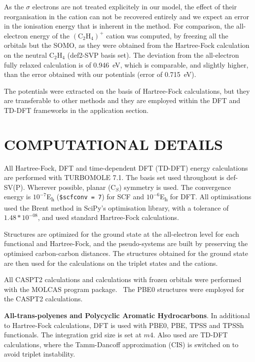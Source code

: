 \documentclass[12pt]{article}
\begin{document}
As the $\sigma$ electrons are not treated explicitely in our model,
the effect of their reorganisation in the cation can not
be recovered entirely and we expect an error in the ionisation energy that is inherent
in the method. For comparison, the all-electron energy of the $(\text{C}_2\text{H}_4)^+$ cation
was computed, by freezing all the orbitals but the SOMO, as they were obtained from
the Hartree-Fock calculation on the neutral $\text{C}_2\text{H}_4$ (def2-SVP basis set).
The deviation from the all-electron fully relaxed calculation is of 0.946~eV, which
is comparable, and slightly higher, than the error obtained with
our potentials (error of 0.715~eV).

The potentials were extracted on the basis of Hartree-Fock calculations, but they are transferable
to other methods and they are employed within the DFT and TD-DFT frameworks in the application section.

\section*{\sffamily \large COMPUTATIONAL DETAILS}

All Hartree-Fock, DFT and time-dependent DFT (TD-DFT) energy calculations are performed with TURBOMOLE 7.1.\cite{TURBOMOLE} The basis set used throughout is def-SV(P).\cite{defsvp} Wherever possible, planar (C\(_{S}\)) symmetry is used. The convergence energy is \(10^{-7}\)E\textsubscript{h} (\texttt{\$scfconv = 7}) for SCF and \(10^{-6}\)E\textsubscript{h} for DFT. All optimisations used the Brent method in SciPy's optimisation library, with a tolerance of \(1.48*10^{-08}\), and used standard Hartree-Fock calculations.\cite{scipy}

Structures are optimized for the ground state at the all-electron level for each functional and Hartree-Fock,
and the pseudo-systems are built by preserving the optimised carbon-carbon distances.
The structures obtained for the ground state are then used for the calculations on the triplet states and
the cations.

All CASPT2 calculations and calculations with frozen orbitals were performed with the 
MOLCAS program package.~\cite{MOLCAS} The PBE0 structures were employed for the
CASPT2 calculations.


\textbf{All-trans-polyenes and Polycyclic Aromatic Hydrocarbons}. In additional to Hartree-Fock calculations, DFT is used with PBE0, PBE, TPSS and TPSSh functionals.\cite{pbe0,pbe,tpss,tpssh} The integration grid size is set at \(m4\). Also used are TD-DFT calculations, where the Tamm-Dancoff approximation (CIS) is switched on to avoid triplet instability.\cite{tammdancoff}
\end{document}
